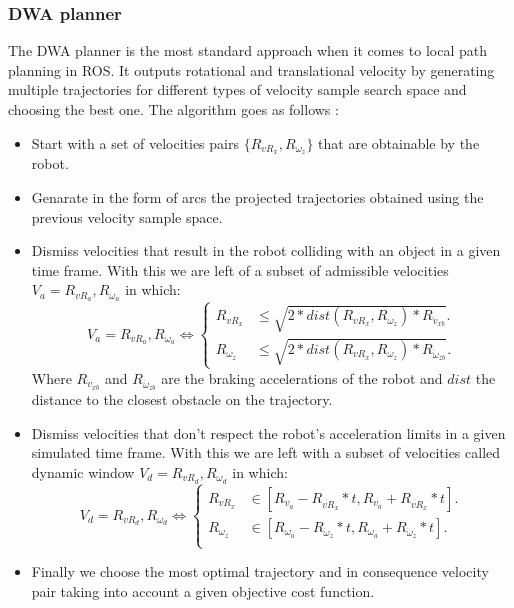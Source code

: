 \subsubsection{DWA planner}\label{dwa}
The \ac{DWA} planner is the most standard approach when it comes to local path planning in \ac{ROS}. It outputs  rotational and translational velocity by generating multiple trajectories for different types of velocity sample search space and choosing the best one. The algorithm goes as follows \cite{inbookdwa}:
\begin{itemize}
    \item Start with a set of velocities pairs $\{R_{vR_x},R_{ \omega_z} \}$ that are obtainable by the robot.
    \item Genarate in the form of arcs the projected trajectories obtained using the previous velocity sample space.
    \item Dismiss velocities that result in the robot colliding with an object in a given time frame. With this we are left of a subset of admissible velocities $V_a=R_{vR_a},R_{ \omega_a}$ in which:
    \begin{equation}
         V_a=R_{vR_a},R_{ \omega_a} \iff \begin{cases}
    R_{vR_x} & 	\leq \sqrt{2*dist(R_{vR_x},R_{ \omega_z})*R_{\dot{v}_{xb}}}.\\
    R_{ \omega_z}  &  	\leq \sqrt{2*dist(R_{vR_x},R_{ \omega_z})*R_{\dot{\omega}_{zb}}}.
  \end{cases}
    \end{equation}
    Where $R_{\dot{v}_{xb}}$ and $R_{\dot{\omega}_{zb}}$ are the braking accelerations of the robot and $dist$ the distance to the closest obstacle on the trajectory.
    
    
    \item Dismiss velocities that don't respect the robot's acceleration limits in a given simulated time frame. With this we are left with a subset of velocities called dynamic window $V_d=R_{vR_d},R_{ \omega_d}$  in which:
    \begin{equation}
         V_d=R_{vR_d},R_{ \omega_d} \iff \begin{cases}
    R_{vR_x} & 	\in [R_{v_a}-R_{\dot{vR}_{x}}*t,R_{v_a} + R_{\dot{vR}_{x}}*t].\\
    R_{\omega_z} & 	\in [R_{ \omega_a}-R_{\dot{\omega}_{z}}*t,R_{\omega_a}+R_{\dot{\omega}_{z}}*t].\\
  \end{cases}
    \end{equation}
    \item Finally we choose  the most optimal trajectory and in consequence velocity pair taking into account a given objective cost function.
    \end{itemize}
